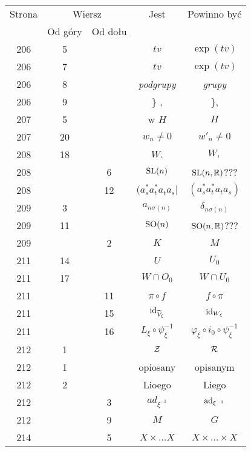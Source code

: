 \documentclass[a4paper,11pt]{article}
\begin{document}
\begin{center}
  \begin{tabular}{|c|c|c|c|c|}
    \hline
    Strona & \multicolumn{2}{c|}{Wiersz} & Jest
                              & Powinno być \\ \cline{2-3}
    & Od góry & Od dołu & & \\
    \hline
    206 & \hphantom{0}5 & & $t v$ & $\exp( t v )$ \\
    206 & \hphantom{0}7 & & $t v$ & $\exp( t v )$ \\
    206 & \hphantom{0}8 & & \textit{podgrupy} & \textit{grupy} \\
    206 & \hphantom{0}9 & & \} , & \}, \\
    207 & \hphantom{0}5 & & w $H$ & $H$ \\
    207 & 20 & & $w_{ n } \neq 0$ & $w'_{ n } \neq 0$ \\
    208 & 18 & & $W.$ & $W,$ \\
    208 & & \hphantom{0}6 & $\mathrm{SL}( n )$ & $\mathrm{SL}( n, \mathbb{R} )$??? \\
    208 & & 12 & $( a^{ * }_{ s } a^{ * }_{ t } a_{ t } a_{ s } |$
           & $( a^{ * }_{ s } a^{ * }_{ t } a_{ t } a_{ s } )$ \\
    209 & \hphantom{0}3 & & $a_{ n \sigma( n ) }$ & $\delta_{ n \sigma( n ) }$ \\
    209 & 11 & & $\mathrm{SO}( n )$ & $\mathrm{SO}( n, \mathbb{R} )$??? \\
    209 & & \hphantom{0}2 & $K$ & $M$ \\
    211 & 14 & & $U$ & $U_{ 0 }$ \\
    211 & 17 & & $W \! \cap \! O_{ 0 }$ & $W \cap U_{ 0 }$ \\[0.2em]
    211 & & 11 & $\pi \circ f$ & $f \circ \pi$ \\
    211 & & 15 & $\mathrm{id}_{ \widetilde{ V }_{ \xi } }$ & $\mathrm{id}_{ W_{ \xi } }$ \\
    211 & & 16 & $L_{ \xi } \circ \psi_{ \xi }^{ -1 }$
           & $\varphi_{ \xi } \circ i_{ 0 } \circ \psi_{ \xi }^{ -1 }$ \\[0.3em]
    212 & \hphantom{0}1 & & $\mathcal{Z}$ & $\mathcal{R}$ \\
    212 & \hphantom{0}1 & & opiosany & opisanym \\
    212 & \hphantom{0}2 & & Lioego & Liego \\
    212 & & \hphantom{0}3 & $ad_{ \xi^{ -1 } }$ & $\mathrm{ad}_{ \xi^{ -1 } }$ \\
    212 & & \hphantom{0}9 & $M$ & $G$ \\
    214 & & \hphantom{0}5 & $X \times \ldots X$ & $X \times \ldots \times X$ \\

\end{tabular}
\end{center}
\end{document}

